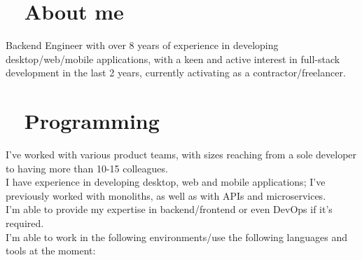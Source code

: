 \documentclass{modernsimplecv}
\newlength{\rightcolwidth}
\begin{document}
\begin{paracol}{2}
\begin{minipage}[t]{\rightcolwidth}
        \end{minipage}
    
        \bigskip
    
        \begin{minipage}[t]{\rightcolwidth}
            \small
            \section*{\hspace{2mm}\faInfo~ About me}
            
            Backend Engineer with over 8 years of experience in developing desktop/web/mobile applications, with a keen and active interest in full-stack development in the last 2 years, currently activating as a contractor/freelancer.
        \end{minipage}
    
        \bigskip
    
        \begin{minipage}[t]{\rightcolwidth}
            \small
            \section{\hspace{1mm}\faCogs~ Programming} 
            {
                \small
                I've worked with various product teams, with sizes reaching from a sole developer to having more than 10-15 colleagues.\\
                
                I have experience in developing desktop, web and mobile applications; I've previously worked with monoliths, as well as with APIs and microservices. \\
                
                I'm able to provide my expertise in backend/frontend or even \newline DevOps if it's required. \\
                
                I'm able to work in the following environments/use the following languages and tools at the moment:
            }
        \end{minipage}\\
    
        \hspace{2em}
    

\end{paracol}
\end{document}
